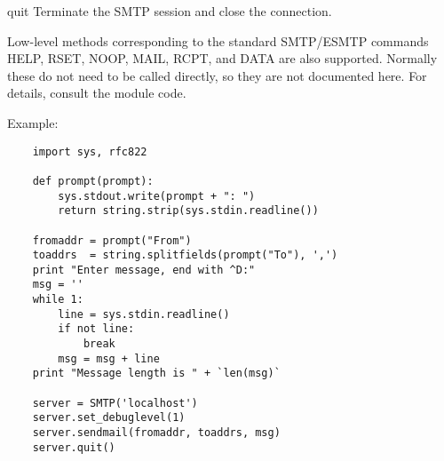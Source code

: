 \begin{methoddesc}{quit}{}
Terminate the SMTP session and close the connection.
\end{methoddesc}

Low-level methods corresponding to the standard SMTP/ESMTP commands
HELP, RSET, NOOP, MAIL, RCPT, and DATA are also supported.  Normally
these do not need to be called directly, so they are not documented
here. For details, consult the module code.

Example:

\begin{verbatim}
    import sys, rfc822

    def prompt(prompt):
        sys.stdout.write(prompt + ": ")
        return string.strip(sys.stdin.readline())

    fromaddr = prompt("From")
    toaddrs  = string.splitfields(prompt("To"), ',')
    print "Enter message, end with ^D:"
    msg = ''
    while 1:
        line = sys.stdin.readline()
        if not line:
            break
        msg = msg + line
    print "Message length is " + `len(msg)`

    server = SMTP('localhost')
    server.set_debuglevel(1)
    server.sendmail(fromaddr, toaddrs, msg)
    server.quit()
\end{verbatim}

